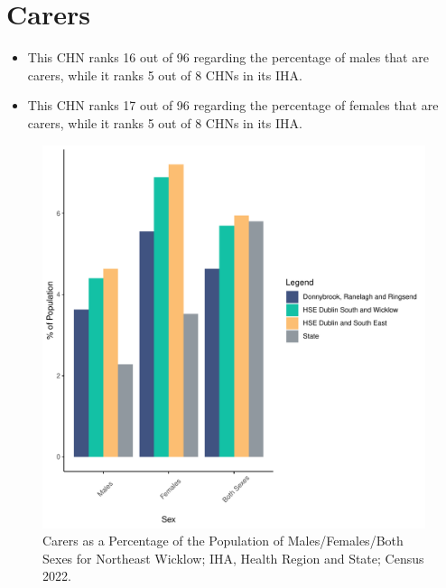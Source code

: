 \documentclass{article}
\begin{document}
\section{Carers}\label{sect:Carers}
\begin{itemize}
\item This CHN ranks  16 out of 96 regarding the percentage of males that are carers, while it ranks   5 out of 8 CHNs in its IHA.
\item This CHN ranks  17 out of 96 regarding the percentage of females that are carers, while it ranks   5 out of 8 CHNs in its IHA.
\end{itemize}
\begin{figure}[H]
	\centering
	\includegraphics[width = 150mm]{../figures/CareED.pdf}
	\caption{Carers as a Percentage of the Population of Males/Females/Both Sexes for Northeast Wicklow; IHA, Health Region and State; Census 2022.}
	\label{fig:2ae19629-1a6a-13a3-e055-000000000001}
	\end{figure}
\end{document}
